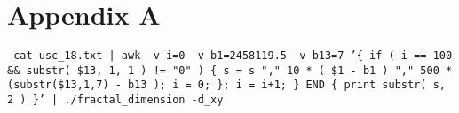 \documentclass[a4paper]{article}
\begin{document}
\section*{Appendix A}


\texttt{\small{ cat usc\_18.txt | awk -v i=0 -v b1=2458119.5 -v b13=7 '\{ if ( i == 100 \&\& substr( \$13, 1, 1 ) != "0" ) \{ s = s "," 10 * ( \$1 - b1 ) "," 500 * (substr(\$13,1,7) - b13 ); i = 0; \}; i = i+1; \} END \{ print substr( s, 2 ) \}' | ./fractal\_dimension -d\_xy }}

\end{document}
